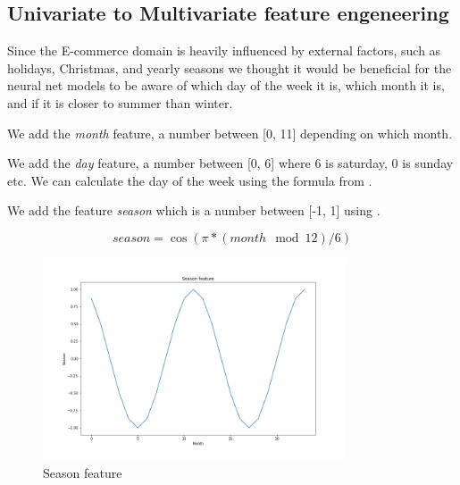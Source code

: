 



\subsection{Univariate to Multivariate feature engeneering}
Since the E-commerce domain is heavily influenced by external factors, such as
holidays, Christmas, and yearly seasons we thought it would be beneficial
for the neural net models to be aware of which day of the week it is,
which month it is, and if it is closer to summer than winter.

We add the \textit{month} feature, a number between [0, 11] depending on which month.

We add the \textit{day} feature, a number between [0, 6] where 6 is saturday, 0 is sunday etc.
We can calculate the day of the week using the formula 
from .

We add the feature \textit{season} which is a number between [-1, 1] using .

\begin{equation}
  season = \cos(\pi * (month \mod{12}) / 6)
  \label{eq:season_feature}
\end{equation}

\begin{figure}[h!]
  \centering
  \includegraphics[width=0.8\textwidth]{./figs/code_generated/season_feature.png}
  \hfill
  \caption{Season feature}
  \label{fig:season-feature}
\end{figure}

